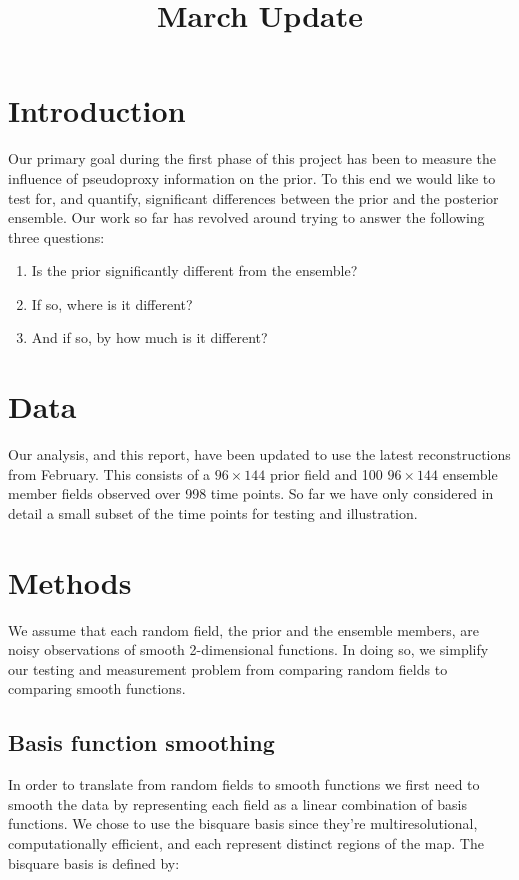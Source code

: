 \documentclass[12pt]{article}
\begin{document}
\title{March Update}
\maketitle

\section{Introduction}
Our primary goal during the first phase of this project has been to measure the influence of pseudoproxy information on the prior. To this end we would like to test for, and quantify, significant differences between the prior and the posterior ensemble. Our work so far has revolved around trying to answer the following three questions:


\begin{enumerate}
\item Is the prior significantly different from the ensemble?
\item If so, where is it different?
\item And if so, by how much is it different?
\end{enumerate}

\section{Data}
Our analysis, and this report, have been updated to use the latest reconstructions from February. This consists of a $96\times144$ prior field and 100 $96\times144$ ensemble member fields observed over 998 time points. So far we have only considered in detail a small subset of the time points for testing and illustration.

\section{Methods}
We assume that each random field, the prior and the ensemble members, are noisy observations of smooth 2-dimensional functions. In doing so, we simplify our testing and measurement problem from comparing random fields to comparing smooth functions. 

\subsection{Basis function smoothing}
In order to translate from random fields to smooth functions we first need to smooth the data by representing each field as a linear combination of basis functions. We chose to use the bisquare basis since they're multiresolutional, computationally efficient, and each represent distinct regions of the map\cite{cressie08}. The bisquare basis is defined by:
\end{document}
